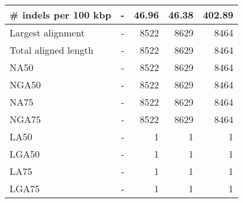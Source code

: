 \documentclass[12pt,a4paper]{article}
\begin{document}
\begin{table}[ht]
\begin{center}
\begin{tabular}{|l*{4}{|r}|}
\# indels per 100 kbp & - & 46.96 & 46.38 & 402.89 \\ \hline
Largest alignment & - & 8522 & 8629 & 8464 \\ \hline
Total aligned length & - & 8522 & 8629 & 8464 \\ \hline
NA50 & - & 8522 & 8629 & 8464 \\ \hline
NGA50 & - & 8522 & 8629 & 8464 \\ \hline
NA75 & - & 8522 & 8629 & 8464 \\ \hline
NGA75 & - & 8522 & 8629 & 8464 \\ \hline
LA50 & - & 1 & 1 & 1 \\ \hline
LGA50 & - & 1 & 1 & 1 \\ \hline
LA75 & - & 1 & 1 & 1 \\ \hline
LGA75 & - & 1 & 1 & 1 \\ \hline
\end{tabular}
\end{center}
\end{table}
\end{document}
